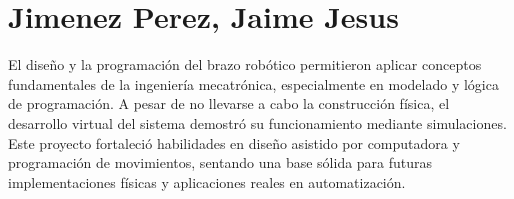 \section{Jimenez Perez, Jaime Jesus}

El diseño y la programación del brazo robótico permitieron aplicar conceptos fundamentales de la ingeniería mecatrónica, especialmente en modelado y lógica de programación. A pesar de no llevarse a cabo la construcción física, el desarrollo virtual del sistema demostró su funcionamiento mediante simulaciones. Este proyecto fortaleció habilidades en diseño asistido por computadora y programación de movimientos, sentando una base sólida para futuras implementaciones físicas y aplicaciones reales en automatización.
